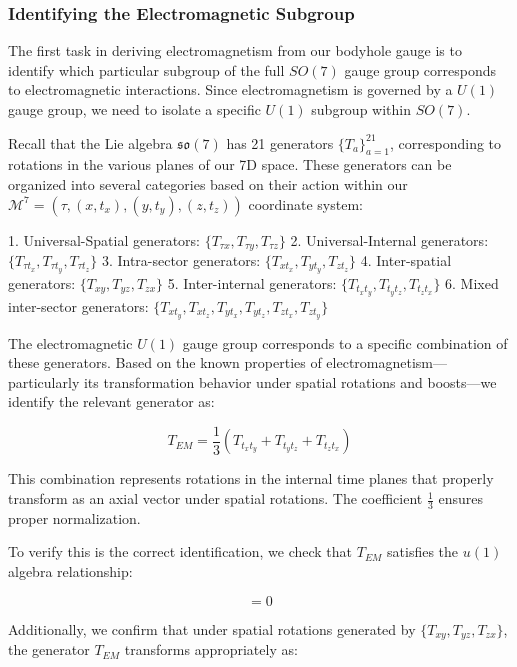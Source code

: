 \documentclass{article}
\begin{document}
\subsubsection{Identifying the Electromagnetic Subgroup}

The first task in deriving electromagnetism from our bodyhole gauge is to identify which particular subgroup of the full $SO(7)$ gauge group corresponds to electromagnetic interactions. Since electromagnetism is governed by a $U(1)$ gauge group, we need to isolate a specific $U(1)$ subgroup within $SO(7)$.

Recall that the Lie algebra $\mathfrak{so}(7)$ has 21 generators $\{T_a\}_{a=1}^{21}$, corresponding to rotations in the various planes of our 7D space. These generators can be organized into several categories based on their action within our $\mathcal{M}^7 = (\tau, (x, t_x), (y, t_y), (z, t_z))$ coordinate system:

1. Universal-Spatial generators: $\{T_{\tau x}, T_{\tau y}, T_{\tau z}\}$
2. Universal-Internal generators: $\{T_{\tau t_x}, T_{\tau t_y}, T_{\tau t_z}\}$
3. Intra-sector generators: $\{T_{x t_x}, T_{y t_y}, T_{z t_z}\}$
4. Inter-spatial generators: $\{T_{xy}, T_{yz}, T_{zx}\}$
5. Inter-internal generators: $\{T_{t_x t_y}, T_{t_y t_z}, T_{t_z t_x}\}$
6. Mixed inter-sector generators: $\{T_{x t_y}, T_{x t_z}, T_{y t_x}, T_{y t_z}, T_{z t_x}, T_{z t_y}\}$

The electromagnetic $U(1)$ gauge group corresponds to a specific combination of these generators. Based on the known properties of electromagnetism—particularly its transformation behavior under spatial rotations and boosts—we identify the relevant generator as:

\begin{equation}
T_{EM} = \frac{1}{3}(T_{t_x t_y} + T_{t_y t_z} + T_{t_z t_x})
\end{equation}

This combination represents rotations in the internal time planes that properly transform as an axial vector under spatial rotations. The coefficient $\frac{1}{3}$ ensures proper normalization.

To verify this is the correct identification, we check that $T_{EM}$ satisfies the $u(1)$ algebra relationship:

\begin{equation}
[T_{EM}, T_{EM}] = 0
\end{equation}

Additionally, we confirm that under spatial rotations generated by $\{T_{xy}, T_{yz}, T_{zx}\}$, the generator $T_{EM}$ transforms appropriately as:
\end{document}
